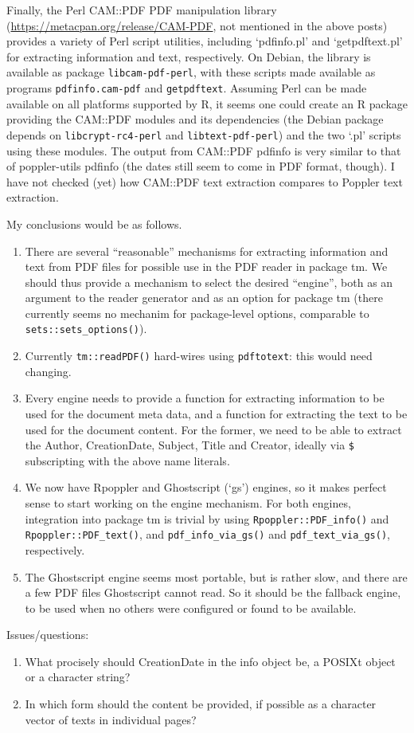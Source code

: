 \documentclass[a4paper]{article}
\newcommand{\file}[1]{`\textsf{#1}'}
\newcommand{\strong}[1]{{\normalfont\fontseries{b}\selectfont #1}}
\let\pkg=\strong
\begin{document}
Finally, the Perl CAM::PDF PDF manipulation library
(\url{https://metacpan.org/release/CAM-PDF}, not mentioned in the above
posts) provides a variety of Perl script utilities, including
\file{pdfinfo.pl} and \file{getpdftext.pl} for extracting information
and text, respectively.  On Debian, the library is available as package
\verb|libcam-pdf-perl|, with these scripts made available as programs
\verb|pdfinfo.cam-pdf| and \verb|getpdftext|.  Assuming Perl can be made
available on all platforms supported by R, it seems one could create an
R package providing the CAM::PDF modules and its dependencies (the
Debian package depends on \verb|libcrypt-rc4-perl| and
\verb|libtext-pdf-perl|) and the two \file{.pl} scripts using these
modules.  The output from CAM::PDF pdfinfo is very similar to that of
poppler-utils pdfinfo (the dates still seem to come in PDF format,
though).  I have not checked (yet) how CAM::PDF text extraction compares
to Poppler text extraction.

My conclusions would be as follows.
\begin{enumerate}
 \item There are several ``reasonable'' mechanisms for extracting
  information and text from PDF files for possible use in the PDF reader
  in package \pkg{tm}.  We should thus provide a mechanism to select the
  desired ``engine'', both as an argument to the reader generator and as
  an option for package \pkg{tm} (there currently seems no mechanim for
  package-level options, comparable to \verb|sets::sets_options()|).

 \item Currently \verb|tm::readPDF()| hard-wires using \verb|pdftotext|:
  this would need changing.

 \item Every engine needs to provide a function for extracting
  information to be used for the document meta data, and a function for
  extracting the text to be used for the document content.  For the
  former, we need to be able to extract the Author, CreationDate,
  Subject, Title and Creator, ideally via \verb|$| subscripting with the
  above name literals.

 \item We now have Rpoppler and Ghostscript (`gs') engines, so it makes
  perfect sense to start working on the engine mechanism.  For both
  engines, integration into package \pkg{tm} is trivial by using
  \verb|Rpoppler::PDF_info()| and \verb|Rpoppler::PDF_text()|, and
  \verb|pdf_info_via_gs()| and \verb|pdf_text_via_gs()|, respectively.

 \item The Ghostscript engine seems most portable, but is rather slow,
  and there are a few PDF files Ghostscript cannot read.  So it should
  be the fallback engine, to be used when no others were configured or
  found to be available.
\end{enumerate}

Issues/questions:
\begin{enumerate}
 \item What procisely should CreationDate in the info object be, a
  POSIXt object or a character string?
 \item In which form should the content be provided, if possible as a
  character vector of texts in individual pages?
\end{enumerate}
\end{document}
